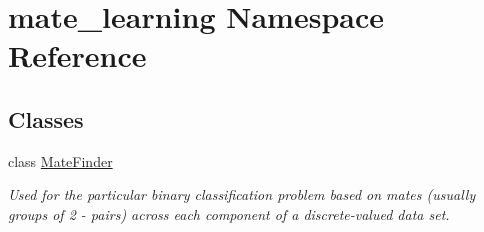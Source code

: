 \hypertarget{namespacemate__learning}{\section{mate\+\_\+learning Namespace Reference}
\label{namespacemate__learning}
}
\subsection*{Classes}
\begin{DoxyCompactItemize}
\item 
class \hyperlink{classmate__learning_1_1_mate_finder}{Mate\+Finder}
\begin{DoxyCompactList}\small\item\em Used for the particular binary classification problem based on mates (usually groups of 2 -\/ pairs) across each component of a discrete-\/valued data set. \end{DoxyCompactList}\end{DoxyCompactItemize}
